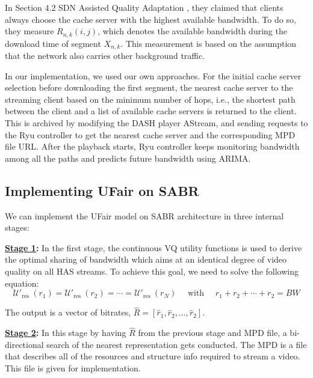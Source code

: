 \documentclass[12pt]{article}
\begin{document}
In Section 4.2 SDN Assisted Quality Adaptation \cite{bhat_network_2017}, they claimed that clients always choose the cache server with the highest available bandwidth. To do so, they measure $R_{n,k}(i,j)$, which denotes the available bandwidth during the download time of segment $X_{n,k}$. This measurement is based on the assumption that the network also carries other background traffic. 

In our implementation, we used our own approaches. For the initial cache server selection before downloading the first segment, the nearest cache server to the streaming client based on the minimum number of hops, i.e., the shortest path between the client and a list of available cache servers is returned to the client. This is archived by modifying the DASH player AStream, and sending requests to the Ryu controller to get the nearest cache server and the corresponding MPD file URL. After the playback starts, Ryu controller keeps monitoring bandwidth among all the paths and predicts future bandwidth using ARIMA. 



\subsection{Implementing UFair on SABR}
We can implement the UFair model on SABR architecture in three internal stages:

\textbf{\underline{Stage 1}:} In the first stage, the continuous VQ utility functions is used to derive the optimal sharing of bandwidth which aims at an identical degree of video quality on all HAS streams. To achieve this goal, we need to solve the following equation:
\begin{equation}
\mathcal{U\prime}_{\text {res }}\left(r_{1}\right)=\mathcal{U\prime}_{\text {res }}\left(r_{2}\right)=\cdots=\mathcal{U\prime}_{\text {res }}\left(r_{N}\right) \quad \text { with } \quad r_{1}+r_{2}+\cdots+r_{2}=B W
\end{equation}

The output is a vector of bitrates, $\hat{R}=\left[\hat{r}_{1}, \hat{r}_{2}, \ldots, \hat{r}_{2}\right]$.

\textbf{\underline{Stage 2}:} In this stage by having $\hat{R}$ from the previous stage and MPD file, a bi-directional search of the nearest representation gets conducted. The MPD is a file that describes all of the resources and structure info required to stream a video. This file is given for implementation.
\end{document}
